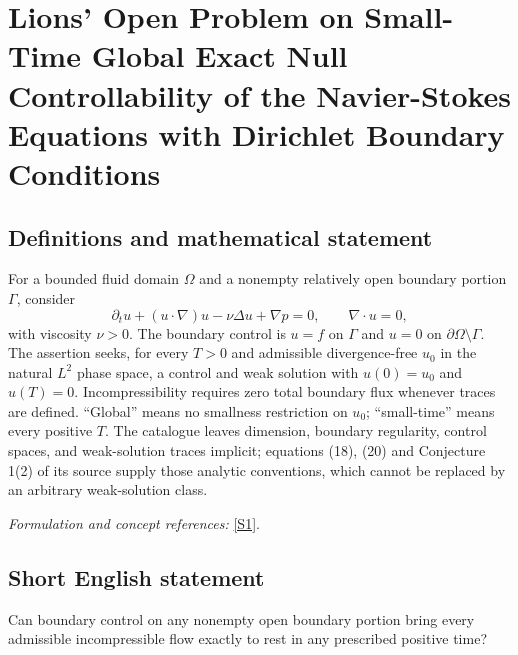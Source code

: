 \documentclass[11pt]{article}
\begin{document}
\section*{\texorpdfstring{Lions' Open Problem on Small-Time Global Exact Null Controllability of the Navier-Stokes Equations with Dirichlet Boundary Conditions}{Lions' Open Problem on Small-Time Global Exact Null Controllability of the Navier-Stokes Equations with Dirichlet Boundary Conditions}}\label{30006863}
\subsection{Definitions and mathematical statement}
For a bounded fluid domain $\Omega$ and a nonempty relatively open boundary portion $\Gamma$, consider
\[
 \partial_tu+(u\cdot\nabla)u-\nu\Delta u+\nabla p=0,
 \qquad\nabla\cdot u=0,
\]
with viscosity $\nu>0$. The boundary control is $u=f$ on $\Gamma$ and $u=0$ on $\partial\Omega\setminus\Gamma$. The assertion seeks, for every $T>0$ and admissible divergence-free $u_0$ in the natural $L^2$ phase space, a control and weak solution with $u(0)=u_0$ and $u(T)=0$. Incompressibility requires zero total boundary flux whenever traces are defined. ``Global'' means no smallness restriction on $u_0$; ``small-time'' means every positive $T$. The catalogue leaves dimension, boundary regularity, control spaces, and weak-solution traces implicit; equations (18), (20) and Conjecture 1(2) of its source supply those analytic conventions, which cannot be replaced by an arbitrary weak-solution class.
\par\smallskip\textit{Formulation and concept references:} \href{https://link.springer.com/article/10.1007/s40324-024-00363-7}{[S1]}.

\subsection{Short English statement}
Can boundary control on any nonempty open boundary portion bring every admissible incompressible flow exactly to rest in any prescribed positive time?
\end{document}
